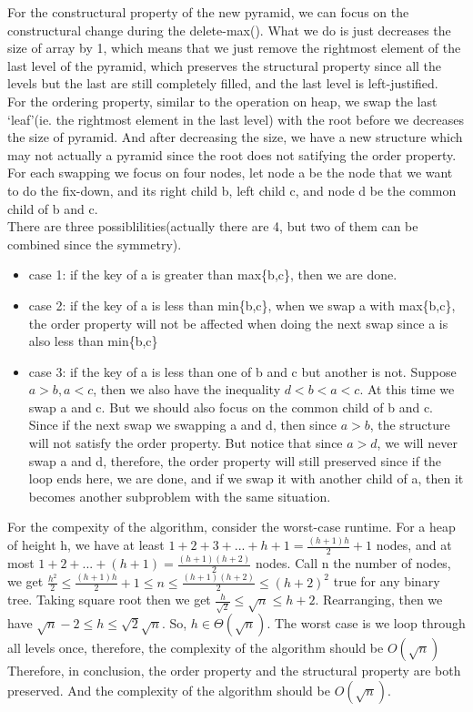 \documentclass[12pt]{article}
\begin{document}
\begin{itemize}
		For the constructural property of the new pyramid, we can focus on the constructural change during the delete-max(). What we do is just decreases the size of array by 1, which means that we just remove the rightmost element of the last level of the pyramid, which preserves the structural property since all the levels but the last are still completely filled, and the last level is left-justified.\\
		For the ordering property, similar to the operation on heap, we swap the last `leaf'(ie. the rightmost element in the last level) with the root before we decreases the size of pyramid. And after decreasing the size, we have a new structure which may not actually a pyramid since the root does not satifying the order property. For each swapping we focus on four nodes, let node a be the node that we want to do the fix-down, and its right child b, left child c, and node d be the common child of b and c.\\
		There are three possiblilities(actually there are 4, but two of them can be combined since the symmetry).
		\begin{itemize}
			\item case 1: if the key of a is greater than max\{b,c\}, then we are done. 
			\item case 2: if the key of a is less than min\{b,c\}, when we swap a with max\{b,c\}, the order property will not be affected when doing the next swap since a is also less than min\{b,c\}
			\item case 3: if the key of a is less than one of b and c but another is not. Suppose $a>b,a<c$, then we also have the inequality $d<b<a<c$. At this time we swap a and c. But we should also focus on the common child of b and c. Since if the next swap we swapping a and d, then since $a>b$, the structure will not satisfy the order property. But notice that since $a>d$, we will never swap a and d, therefore, the order property will still preserved since if the loop ends here, we are done, and if we swap it with another child of a, then it becomes another subproblem with the same situation.
		\end{itemize}
		For the compexity of the algorithm, consider the worst-case runtime.
		For a heap of height h, we have at least $1+2+3+...+h+1=\frac{(h+1)h}{2}+1$ nodes, and at most $1+2+...+(h+1)=\frac{(h+1)(h+2)}{2}$ nodes. Call n the number of nodes, we get $\frac{h^2}{2} \leq \frac{(h+1)h}{2}+1 \leq n \leq \frac{(h+1)(h+2)}{2} \leq (h+2)^2$ true for any binary tree. Taking square root then we get $\frac{h}{\sqrt{2}} \leq \sqrt{n} \leq h+2$. Rearranging, then we have $\sqrt{n}-2 \leq h \leq \sqrt{2}\sqrt{n}$. So, $h\in \Theta(\sqrt{n})$. The worst case is we loop through all levels once, therefore, the complexity of the algorithm should be $O(\sqrt{n})$\\
		Therefore, in conclusion, the order property and the structural property are both preserved. And the complexity of the algorithm should be $O(\sqrt{n})$.
		

\end{itemize}
\end{document}
